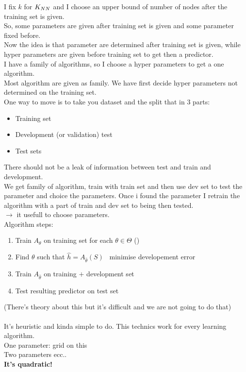 \documentclass[../main.tex]{subfiles}
\begin{document}
I fix $k$ for $K_{NN}$ and I choose an upper bound of number of nodes after the
training set is given.\\
So, some parameters are given after training set is given and some parameter
fixed before.\\
Now the idea is that parameter are determined after training set is given, while
hyper parameters are given before training set to get then a predictor.\\
I have a family of algorithms, so I choose a hyper parameters to get a one
algorithm.\\
Most algorithm are given as family. We have first decide hyper parameters not
determined on the training set.\\
One way to move is to take you dataset and the split that in 3 parts:
\begin{itemize}
\item Training set
\item Development (or validation) test
\item Test sets
\end{itemize}
There should not be a leak of information between test and train and
development.\\
We get family of algorithm, train with train set and then use dev set to test the
parameter and choice the parameters.
Once i found the parameter I retrain the algorithm with a part of train and dev
set to being then tested.
\\
 $\rightarrow$ it usefull to choose parameters.
\\
Algorithm steps:
\begin{enumerate}
\item  Train $A_\theta$ on training set for each $\theta \in \Theta $ () 
\item Find $\theta$ such that $\hat{h}= A_{\hat{\theta}}\left(S\right)$ \, minimise developement error
\item Train $A_{\hat{\theta}}$ on training $+$ development set
\item Test resulting predictor on test set
\end{enumerate}
(There's theory about this but it's difficult and we are not going to do that)
\\\\
It’s heuristic and kinda simple to do. This technics work for every learning
algorithm.\\
One parameter: grid on this\\
Two parameters ecc..\\
\textbf{It’s quadratic!}\\
\end{document}
